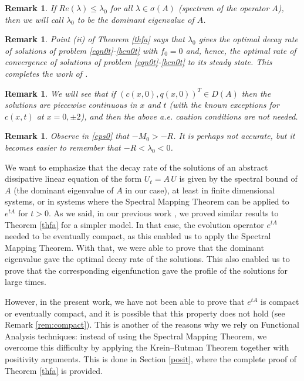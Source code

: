 \documentclass[a4paper]{article}
\newtheorem{rem}[thm]{Remark}
\numberwithin{equation}{section}
\begin{document}
\begin{rem}
If $Re(\lambda)\leq \lambda_0$ for all $\lambda\in \sigma(A)$ (spectrum of the operator $A$), then we will call $\lambda_0$ to be the dominant eigenvalue of $A$.
\end{rem}
\begin{rem}
Point (ii) of Theorem \ref{thfa} says that $\lambda_0$ gives the optimal decay rate of solutions of problem \eqref{eqn0t}-\eqref{bcn0t} with $f_0=0$ and, hence, the optimal rate of convergence of solutions of problem \eqref{eqn0t}-\eqref{bcn0t} to its steady state. This completes the work of \cite{Menacho-SM}.
\end{rem}
\begin{rem}
We will see that if $(c(x,0),q(x,0))^T\in D(A)$ then the solutions are piecewise continuous in $x$ and $t$ (with the known exceptions for $c(x,t)$ at $x=0,\pm2$), and then the above a.e. caution conditions are not needed.
\end{rem}
\begin{rem}
Observe in \eqref{eps0} that $-M_0>-R$. It is perhaps not accurate, but it becomes easier to remember that $-R<\lambda_0<0$.
\end{rem}
We want to emphasize that the decay rate of the solutions of an abstract dissipative linear equation of the form $U_t=A\,U$ is given by the spectral bound of $A$ (the dominant eigenvalue of $A$ in our case), at least in finite dimensional systems, or in systems where the Spectral Mapping Theorem can be applied to $e^{tA}$ for $t>0$. As we said, in our previous work \cite{Menacho-Pell-SM}, we proved similar results to Theorem \ref{thfa} for a simpler model. In that case, the evolution operator $e^{tA}$ needed to be eventually compact, as this enabled us to apply the Spectral Mapping Theorem. With that, we were able to prove that the dominant eigenvalue gave the optimal decay rate of the solutions. This also enabled us to prove that the corresponding eigenfunction gave the profile of the solutions for large times.

However, in the present work, we have not been able to prove that $e^{tA}$ is compact or eventually compact, and it is possible that this property does not hold (see Remark \ref{rem:compact}). This is another of the reasons why we rely on Functional Analysis techniques: instead of using the Spectral Mapping Theorem, we overcome this difficulty by applying the Krein--Rutman Theorem together with positivity arguments. This is done in Section \ref{posit}, where the complete proof of Theorem \ref{thfa} is provided.
\end{document}
